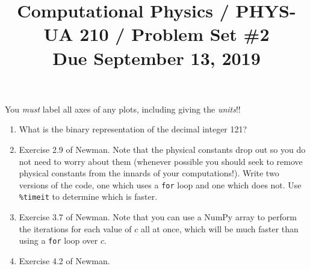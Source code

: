 \documentclass[11pt, preprint]{aastex}
\begin{document}
\title{\bf Computational Physics / PHYS-UA 210 / Problem Set \#2
\\ Due September 13, 2019 }

You {\it must} label all axes of any plots, including giving the {\it
  units}!!

\begin{enumerate}

  \item What is the binary representation of the decimal integer 121? 

  \item Exercise 2.9 of Newman. Note that the physical constants drop
    out so you do not need to worry about them (whenever possible you
    should seek to remove physical constants from the innards of your
    computations!).  Write two versions of the code, one which uses a
    {\tt for} loop and one which does not.  Use {\tt \%timeit} to
    determine which is faster.

  \item Exercise 3.7 of Newman.  Note that you can use a NumPy array
    to perform the iterations for each value of $c$ all at once, which
    will be much faster than using a {\tt for} loop over $c$.

  \item Exercise 4.2 of Newman.

\end{enumerate}
\end{document}
